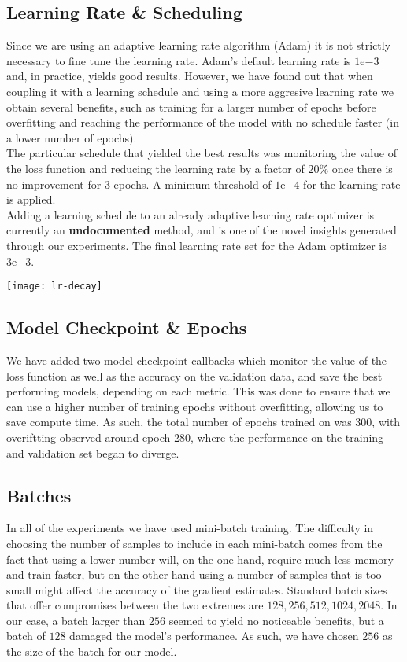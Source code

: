 \subsection{Learning Rate \& Scheduling}
Since we are using an adaptive learning rate algorithm (Adam) it is not strictly necessary to fine tune the learning rate. 		Adam's default learning rate is $1\mathrm{e}{-3}$ and, in practice, yields good results. However, we have found out that when 	coupling it with a learning schedule and using a more aggresive learning rate we obtain several benefits, such as training for a 	larger number of epochs before overfitting and reaching the performance of the model with no schedule faster (in a lower number 	of epochs). \\
The particular schedule that yielded the best results was monitoring the value of the loss function and reducing the learning 	rate by a factor of $20\%$ once there is no improvement for 3 epochs. A minimum threshold of $1\mathrm{e}{-4}$ for the learning rate is applied.\\
Adding a learning schedule to an already adaptive learning rate optimizer is currently an \textbf{undocumented} method, and is one of the novel insights generated through our experiments. The final learning rate set for the Adam optimizer is $3\mathrm{e}{-3}$.\\
\begin{center}
\texttt{[image: lr-decay]}
\end{center}
\subsection{Model Checkpoint \& Epochs}
We have added two model checkpoint callbacks which monitor the value of the loss function as well as the accuracy on the validation data, and save the best performing models, depending on each metric. This was done to ensure that we can use a higher number of training epochs without overfitting, allowing us to save compute time. As such, the total number of epochs trained on was 300, with overiftting observed around epoch 280, where the performance on the training and validation set began to diverge.
\subsection{Batches}
In all of the experiments we have used mini-batch training. The difficulty in choosing the number of samples to include in each mini-batch comes from the fact that using a lower number will, on the one hand, require much less memory and train faster, but on the other hand using a number of samples that is too small might affect the accuracy of the gradient estimates. Standard batch sizes that offer compromises between the two extremes are $128,256,512,1024,2048$. In our case, a batch larger than $256$ seemed to yield no noticeable benefits, but a batch of $128$ damaged the model's performance. As such, we have chosen $256$ as the size of the batch for our model.

